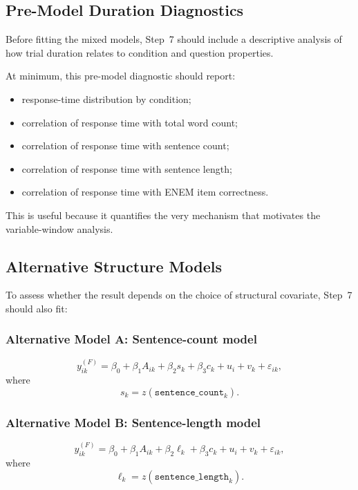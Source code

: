 \subsection{Pre-Model Duration Diagnostics}
Before fitting the mixed models, Step~7 should include a descriptive analysis of how trial duration
relates to condition and question properties.

At minimum, this pre-model diagnostic should report:
\begin{itemize}
    \item response-time distribution by condition;
    \item correlation of response time with total word count;
    \item correlation of response time with sentence count;
    \item correlation of response time with sentence length;
    \item correlation of response time with ENEM item correctness.
\end{itemize}

This is useful because it quantifies the very mechanism that motivates the variable-window analysis.

\subsection{Alternative Structure Models}
To assess whether the result depends on the choice of structural covariate, Step~7 should also fit:

\subsubsection{Alternative Model A: Sentence-count model}
\begin{equation}
y^{(F)}_{ik}
=
\beta_0
+
\beta_1 A_{ik}
+
\beta_2 s_k
+
\beta_3 c_k
+
u_i
+
v_k
+
\varepsilon_{ik},
\end{equation}
where
\begin{equation}
s_k = z(\texttt{sentence\_count}_k).
\end{equation}

\subsubsection{Alternative Model B: Sentence-length model}
\begin{equation}
y^{(F)}_{ik}
=
\beta_0
+
\beta_1 A_{ik}
+
\beta_2 \ell_k
+
\beta_3 c_k
+
u_i
+
v_k
+
\varepsilon_{ik},
\end{equation}
where
\begin{equation}
\ell_k = z(\texttt{sentence\_length}_k).
\end{equation}

